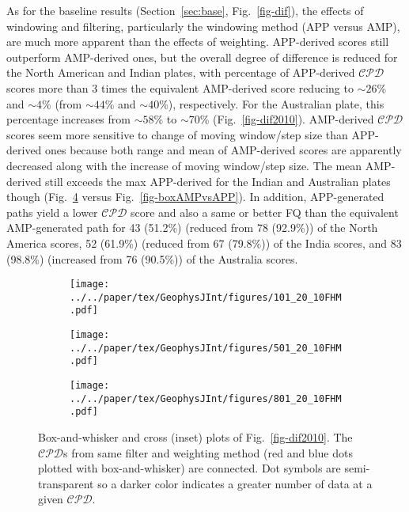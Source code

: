 As for the baseline results (Section~\ref{sec:base}, Fig.~\ref{fig-dif}), the
effects of windowing and filtering, particularly the windowing method (APP
versus AMP), are much more apparent than the effects of weighting. APP-derived
scores still outperform AMP-derived ones, but the overall degree of difference
is reduced for the North American and Indian plates, with percentage of
APP-derived $\mathcal{CPD}$ scores more than 3 times the equivalent AMP-derived
score reducing to ${\sim}26$\% and ${\sim}4$\% (from ${\sim}44$\% and
${\sim}40$\%), respectively. For the Australian plate, this percentage increases
from ${\sim}58$\% to ${\sim}70$\% (Fig.~\ref{fig-dif2010}). AMP-derived
$\mathcal{CPD}$ scores seem more sensitive to change of moving window/step size
than APP-derived ones because both range and mean of AMP-derived scores are
apparently decreased along with the increase of moving window/step size. The
mean AMP-derived still exceeds the max APP-derived for the Indian and Australian
plates though (Fig.~\ref{fig-boxAMPvsAPP2010} versus
Fig.~\ref{fig-boxAMPvsAPP}). In addition, APP-generated paths yield a lower
$\mathcal{CPD}$ score and also a same or better FQ than the equivalent
AMP-generated path for 43 (51.2\%) (reduced from 78 (92.9\%)) of the North
America scores, 52 (61.9\%) (reduced from 67 (79.8\%)) of the India scores, and
83 (98.8\%) (increased from 76 (90.5\%)) of the Australia scores.

\begin{figure}
  \centering
  \begin{subfigure}{1\textwidth}
    \texttt{[image: ../../paper/tex/GeophysJInt/figures/101\_20\_10FHM.pdf]}
    \caption{}\label{fig-na-boxAMPvsAPP2010}
  \end{subfigure}
  \vspace{.1em}
  \begin{subfigure}{1\textwidth}
    \texttt{[image: ../../paper/tex/GeophysJInt/figures/501\_20\_10FHM.pdf]}
    \caption{}\label{fig-in-boxAMPvsAPP2010}
  \end{subfigure}
  \vspace{.1em}
  \begin{subfigure}{1\textwidth}
    \texttt{[image: ../../paper/tex/GeophysJInt/figures/801\_20\_10FHM.pdf]}
    \caption{}\label{fig-au-boxAMPvsAPP2010}
  \end{subfigure}
  \caption[]{Box-and-whisker and cross (inset) plots of Fig.~\ref{fig-dif2010}.
The $\mathcal{CPD}$s from same filter and weighting method (red and blue dots
plotted with box-and-whisker) are connected. Dot symbols are semi-transparent so
a darker color indicates a greater number of data at a given
$\mathcal{CPD}$.}\label{fig-boxAMPvsAPP2010}
\end{figure}

